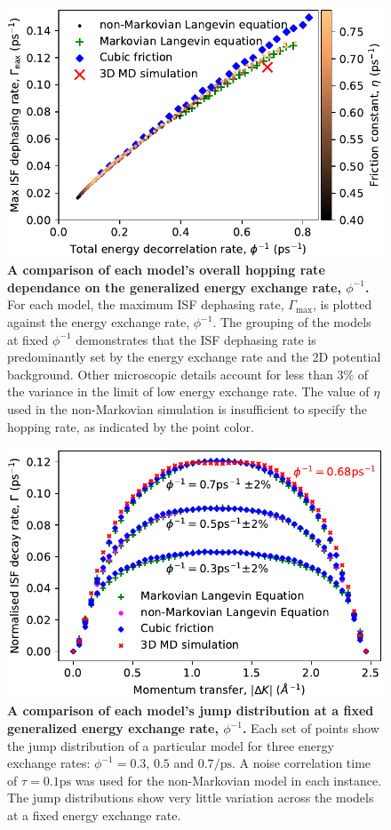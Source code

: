 \documentclass[7pt]{article}
\newcommand{\ps}{\si{\pico\second}}
\newcommand{\ips}{\si{\per\pico\second}}
\begin{document}
\begin{figure}
	\centering
	\includegraphics[width=1.0\columnwidth]{gamma_ttf}
	\caption{\textbf{A comparison of each model's overall hopping rate dependance on the generalized energy exchange rate, $\phi^{-1}$.} For each model, the maximum ISF dephasing rate, $\Gamma_{\text{max}}$, is plotted against the energy exchange rate, $\phi^{-1}$. The grouping of the models at fixed $\phi^{-1}$ demonstrates that the ISF dephasing rate is predominantly set by the energy exchange rate and the 2D potential background. Other microscopic details account for less than $3\%$ of the variance in the limit of low energy exchange rate. The value of $\eta$ used in the non-Markovian simulation is insufficient to specify the hopping rate, as indicated by the point color.} 
	\label{fig:gamma_ttf}
\end{figure}

\begin{figure}
	\centering
	\includegraphics[width=1.0\columnwidth]{jump_distribution}
	\caption{\textbf{A comparison of each model's jump distribution at a fixed generalized energy exchange rate, $\phi^{-1}$.} Each set of points show the jump distribution of a particular model for three energy exchange rates: $\phi^{-1}=0.3$, $0.5$ and $0.7\ips$. A noise correlation time of $\tau=0.1\ps$ was used for the non-Markovian model in each instance. The jump distributions show very little variation across the models at a fixed energy exchange rate.} 
	\label{fig:jump_distribution}
\end{figure}
\end{document}
